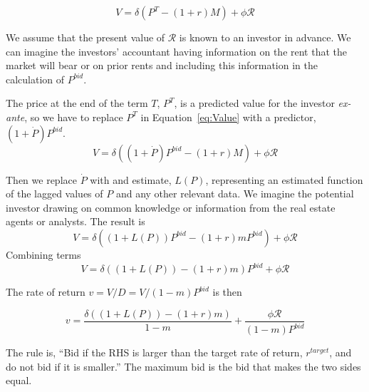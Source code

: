 \[V= \delta(P^T- (1+r)M)   +\phi  \mathcal{R}\]

We assume that the present value of $\mathcal{R}$ is known to an investor in advance. We can imagine the investors' accountant having information on the rent that the market will bear or on prior rents and including this information in the calculation of $P^{bid}$.

The  price at the end of the term $T$,  $P^T$, is a predicted value  for the investor \textit{ex-ante}, so we have to replace $P^T$ in Equation~\ref{eq:Value} with a predictor, $(1+\dot P)P^{bid}$. 
\[V= \delta((1+\dot P)P^{bid}- (1+r)M)   +\phi  \mathcal{R}\]

Then we replace $\dot P$ with and estimate, $L(P)$, representing an estimated function of the lagged values of $P$ and any  other relevant data. We imagine the potential investor drawing on common  knowledge or information from the real estate agents or analysts.  The result is 
\[V= \delta((1+L(P))P^{bid}- (1+r)mP^{bid})   +\phi \mathcal{R}\]
Combining terms
\[V= \delta((1+L(P))- (1+r)m)P^{bid}   +\phi \mathcal{R}\]

The rate of return $v=V/D=V/(1-m)P^{bid}$ is then

\[v= \frac{\delta((1+L(P))- (1+r)m)}{1-m}   +\frac{\phi \mathcal{R}}{(1-m)P^{bid}}\]




The rule is, ``Bid if the RHS is larger than the target rate of return, $r^{target}$, and do not bid if it is smaller.''  The maximum bid  is the bid that makes the two sides equal. 

